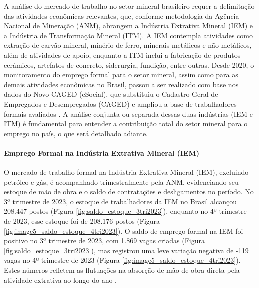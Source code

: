 A análise do mercado de trabalho no setor mineral brasileiro requer a delimitação das atividades econômicas relevantes, que, conforme metodologia da Agência Nacional de Mineração (ANM), abrangem a Indústria Extrativa Mineral (IEM) e a Indústria de Transformação Mineral (ITM). A IEM contempla atividades como extração de carvão mineral, minério de ferro, minerais metálicos e não metálicos, além de atividades de apoio, enquanto a ITM inclui a fabricação de produtos cerâmicos, artefatos de concreto, siderurgia, fundição, entre outras. Desde 2020, o monitoramento do emprego formal para o setor mineral, assim como para as demais atividades econômicas no Brasil, passou a ser realizado com base nos dados do Novo CAGED (eSocial), que substituiu o Cadastro Geral de Empregados e Desempregados (CAGED) e ampliou a base de trabalhadores formais avaliados \cite{anm2023c,anm2023d}. A análise conjunta ou separada dessas duas indústrias (IEM e ITM) é fundamental para entender a contribuição total do setor mineral para o emprego no país, o que será detalhado adiante.

\paragraph{Emprego Formal na Indústria Extrativa Mineral (IEM)}

O mercado de trabalho formal na Indústria Extrativa Mineral (IEM), excluindo petróleo e gás, é acompanhado trimestralmente pela ANM, evidenciando seu estoque de mão de obra e o saldo de contratações e desligamentos no período. No 3º trimestre de 2023, o estoque de trabalhadores da IEM no Brasil alcançou 208.447 postos (Figura \ref{fig:saldo_estoque_3tri2023}), enquanto no 4º trimestre de 2023, esse estoque foi de 208.176 postos (Figura \ref{fig:image5_saldo_estoque_4tri2023}). O saldo de emprego formal na IEM foi positivo no 3º trimestre de 2023, com 1.869 vagas criadas (Figura \ref{fig:saldo_estoque_3tri2023}), mas registrou uma leve variação negativa de -119 vagas no 4º trimestre de 2023 (Figura \ref{fig:image5_saldo_estoque_4tri2023}). Estes números refletem as flutuações na absorção de mão de obra direta pela atividade extrativa ao longo do ano \cite{anm2023c,anm2023d}.

